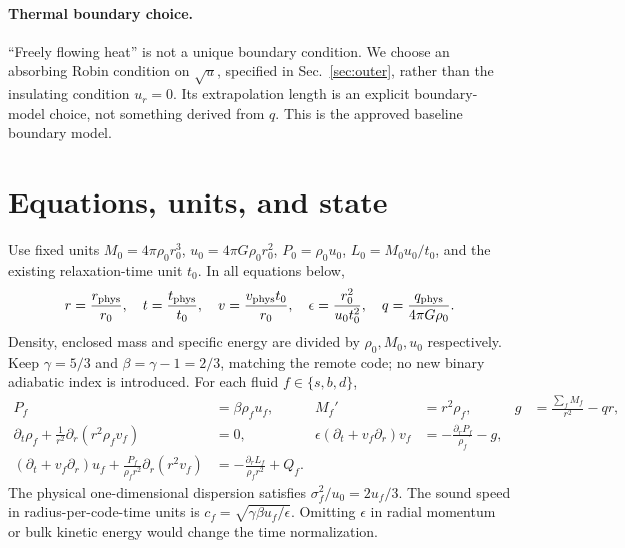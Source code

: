 \documentclass[11pt]{article}
\begin{document}
\paragraph{Thermal boundary choice.}
``Freely flowing heat'' is not a unique boundary condition. We choose an
absorbing Robin condition on $\sqrt u$, specified in
Sec.~\ref{sec:outer}, rather than the insulating condition $u_r=0$.
Its extrapolation length is an explicit boundary-model choice, not
something derived from $q$. This is the approved baseline boundary model.

\section{Equations, units, and state}
Use fixed units $M_0=4\pi\rho_0r_0^3$, $u_0=4\pi G\rho_0r_0^2$,
$P_0=\rho_0u_0$, $L_0=M_0u_0/t_0$, and the existing relaxation-time
unit $t_0$. In all equations below,
\begin{equation}
 r=\frac{r_{\rm phys}}{r_0},\quad t=\frac{t_{\rm phys}}{t_0},\quad
 v=\frac{v_{\rm phys}t_0}{r_0},\quad
 \epsilon=\frac{r_0^2}{u_0t_0^2},\quad
 q=\frac{q_{\rm phys}}{4\pi G\rho_0}.
\end{equation}
Density, enclosed mass and specific energy are divided by
$\rho_0,M_0,u_0$ respectively. Keep $\gamma=5/3$ and
$\beta=\gamma-1=2/3$, matching the remote code; no new binary adiabatic
index is introduced. For each fluid $f\in\{s,b,d\}$,
\begin{align}
 P_f&=\beta\rho_fu_f,&
 M_f'&=r^2\rho_f,&
 g&=\frac{\sum_fM_f}{r^2}-qr,\\
 \partial_t\rho_f+\frac{1}{r^2}\partial_r(r^2\rho_fv_f)&=0,&
 \epsilon(\partial_t+v_f\partial_r)v_f&=-\frac{\partial_rP_f}{\rho_f}-g,
 \label{eq:pde}\\
 (\partial_t+v_f\partial_r)u_f+\frac{P_f}{\rho_f r^2}
 \partial_r(r^2v_f)&=-\frac{\partial_rL_f}{\rho_f r^2}+Q_f.
\end{align}
The physical one-dimensional dispersion satisfies
$\sigma_f^2/u_0=2u_f/3$. The sound speed in radius-per-code-time units is
$c_f=\sqrt{\gamma\beta u_f/\epsilon}$. Omitting $\epsilon$ in radial
momentum or bulk kinetic energy would change the time normalization.
\end{document}
